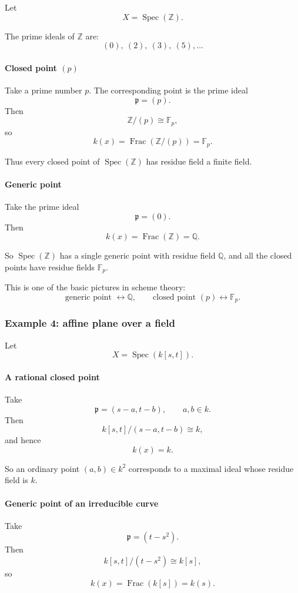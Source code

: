 \documentclass[12pt,a4paper]{article}
\theoremstyle{notespace}
\newcommand{\Spec}{\operatorname{Spec}}
\newcommand{\Frac}{\operatorname{Frac}}
\newcommand{\Z}{\mathbb Z}
\newcommand{\Q}{\mathbb Q}
\newcommand{\F}{\mathbb F}
\newcommand{\p}{\mathfrak p}
\theoremstyle{definition}
\begin{document}
Let
\[
X=\Spec(\Z).
\]

The prime ideals of \(\Z\) are:
\[
(0),\ (2),\ (3),\ (5),\dots
\]

\paragraph{Closed point \((p)\)}

Take a prime number \(p\). The corresponding point is the prime ideal
\[
\p=(p).
\]
Then
\[
\Z/(p)\cong \F_p,
\]
so
\[
k(x)=\Frac(\Z/(p))=\F_p.
\]

Thus every closed point of \(\Spec(\Z)\) has residue field a finite field.

\paragraph{Generic point}

Take the prime ideal
\[
\p=(0).
\]
Then
\[
k(x)=\Frac(\Z)=\Q.
\]

So \(\Spec(\Z)\) has a single generic point with residue field \(\Q\), and all the closed points have residue fields \(\F_p\).

This is one of the basic pictures in scheme theory:
\[
\text{generic point } \leftrightarrow \Q,\qquad
\text{closed point } (p)\leftrightarrow \F_p.
\]

\subsubsection{Example 4: affine plane over a field}

Let
\[
X=\Spec(k[s,t]).
\]

\paragraph{A rational closed point}

Take
\[
\p=(s-a,t-b),\qquad a,b\in k.
\]
Then
\[
k[s,t]/(s-a,t-b)\cong k,
\]
and hence
\[
k(x)=k.
\]

So an ordinary point \((a,b)\in k^2\) corresponds to a maximal ideal whose residue field is \(k\).

\paragraph{Generic point of an irreducible curve}

Take
\[
\p=(t-s^2).
\]
Then
\[
k[s,t]/(t-s^2)\cong k[s],
\]
so
\[
k(x)=\Frac(k[s])=k(s).
\]
\end{document}

